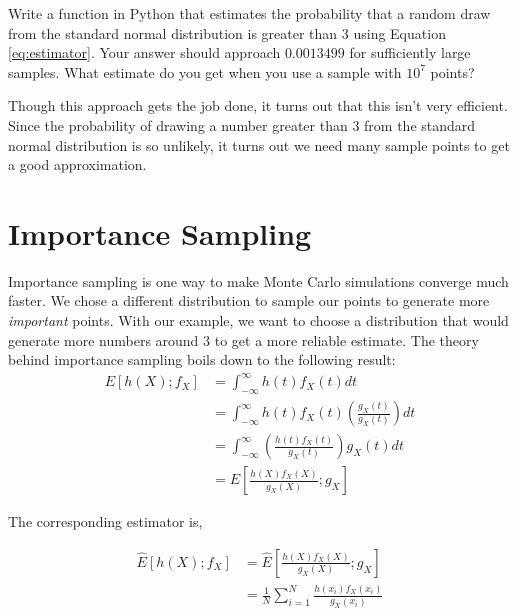 \begin{problem} \label{prob:mc}
Write a function in Python that estimates the probability that a random draw from the standard normal distribution is greater than 3 using Equation \ref{eq:estimator}. Your answer should approach $0.0013499$ for sufficiently large samples. What estimate do you get when you use a sample with $10^7$ points?
\end{problem}

Though this approach gets the job done, it turns out that this isn't very efficient. Since the probability of drawing a number greater than $3$ from the standard normal distribution is so unlikely, it turns out we need many sample points to get a good approximation.

\section*{Importance Sampling}
Importance sampling is one way to make Monte Carlo simulations converge much faster. We chose a different distribution to sample our points to generate more \emph{important} points. With our example, we want to choose a distribution that would generate more numbers around 3 to get a more reliable estimate. The theory behind importance sampling boils down to the following result:
\begin{equation} \label{eq:importance}
\begin{split}
E[h(X);f_X] & = \int_{-\infty}^{\infty} h(t)f_X(t) dt \\
& = \int_{-\infty}^{\infty} h(t)f_X(t)\left ( \frac{g_X(t)}{g_X(t)} \right ) dt \\
& = \int_{-\infty}^{\infty} \left ( \frac{h(t)f_X(t)}{g_X(t)} \right )g_X(t) dt \\
& = E\left [ \frac{h(X)f_X(X)}{g_X(X)} ; g_X \right ]
\end{split}
\end{equation}

The corresponding estimator is,

\begin{equation*}
\begin{split}
\widehat{E}[h(X);f_X] & = \widehat{E}\left [ \frac{h(X)f_X(X)}{g_X(X)} ; g_X \right ] \\
& = \frac{1}{N}\sum_{i = 1}^{N}\frac{h(x_i)f_X(x_i)}{g_X(x_i)}
\end{split}
\end{equation*}

